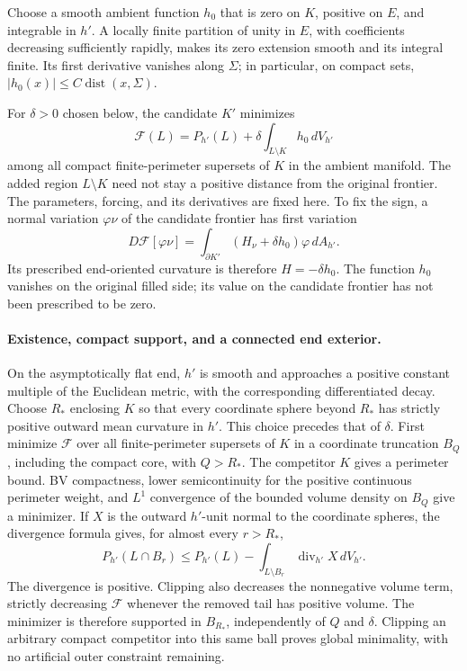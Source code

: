 Choose a smooth ambient function $h_0$ that is zero on $K$, positive
on $E$, and integrable in $h'$. A locally finite partition of unity
in $E$, with coefficients decreasing sufficiently rapidly, makes its
zero extension smooth and its integral finite. Its first derivative
vanishes along $\Sigma$; in particular, on compact sets,
$|h_0(x)|\le C\operatorname{dist}(x,\Sigma)$.

For $\delta>0$ chosen below, the candidate $K'$ minimizes
\[
 \mathcal F(L)=P_{h'}(L)
       +\delta\int_{L\setminus K}h_0\,dV_{h'}
\]
among all compact finite-perimeter supersets of $K$ in the ambient
manifold. The added region $L\setminus K$ need not stay a positive
distance from the original frontier. The parameters, forcing, and its derivatives are
fixed here. To fix the sign, a normal variation $\varphi\nu$ of the candidate
frontier has first variation
\[
 D\mathcal F[\varphi\nu]
   =\int_{\partial K'}(H_\nu+\delta h_0)\varphi\,dA_{h'}.
\]
Its prescribed end-oriented curvature is therefore $H=-\delta h_0$.
The function $h_0$ vanishes on the original filled side; its value on
the candidate frontier has not been prescribed to be zero.

\paragraph{Existence, compact support, and a connected end exterior.}
On the asymptotically flat end, $h'$ is smooth and approaches a positive constant multiple
of the Euclidean metric, with the corresponding differentiated decay.
Choose $R_*$ enclosing $K$ so that every coordinate sphere beyond
$R_*$ has strictly positive outward mean curvature in $h'$. This
choice precedes that of $\delta$. First minimize $\mathcal F$ over
all finite-perimeter supersets of $K$ in a coordinate truncation
$B_Q$, including the compact core, with $Q>R_*$.
The competitor $K$ gives a perimeter bound. BV compactness, lower
semicontinuity for the positive continuous perimeter weight, and
$L^1$ convergence of the bounded volume density on $B_Q$ give a
minimizer. If $X$ is the outward $h'$-unit normal to the coordinate
spheres, the divergence formula gives, for almost every $r>R_*$,
\[
 P_{h'}(L\cap B_r)
 \le P_{h'}(L)
       -\int_{L\setminus B_r}\operatorname{div}_{h'}X\,dV_{h'}.
\]
The divergence is positive. Clipping also decreases the nonnegative
volume term, strictly decreasing $\mathcal F$ whenever the removed
tail has positive volume. The minimizer is therefore supported in
$B_{R_*}$, independently of $Q$ and $\delta$. Clipping an arbitrary
compact competitor into this same ball proves global minimality,
with no artificial outer constraint remaining.

